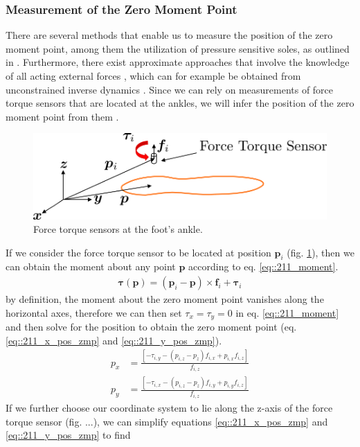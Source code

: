 \subsubsection{Measurement of the Zero Moment Point}
There are several methods that enable us to measure the position of the zero moment point, among them the utilization of pressure sensitive soles, as outlined in \cite{kajita2014introduction}. Furthermore, there exist approximate approaches that involve the knowledge of all acting external forces \cite{huang2001planning}, which can for example be obtained from unconstrained inverse dynamics \cite{michel2017dynamic}. Since we can rely on measurements of force torque sensors that are located at the ankles, we will infer the position of the zero moment point from them \cite{kajita2014introduction}. 
\begin{figure}[h!]
	\centering
	\includegraphics[scale=.5]{chapters/02_background/img/ft_sensor.png}
	\caption{Force torque sensors at the foot's ankle.}
	\label{fig::211_force_torque}
\end{figure}
If we consider the force torque sensor to be located at position $\bm{p}_i$ (fig. \ref{fig::211_force_torque}), then we can obtain the moment about any point $\bm{p}$ according to eq. \ref{eq::211_moment}.
\begin{align}
	\bm{\tau}(\bm{p}) = (\bm{p}_i-\bm{p})\times \bm{f}_i + \bm{\tau}_i
	\label{eq::211_moment}
\end{align}
by definition, the moment about the zero moment point vanishes along the horizontal axes, therefore we can then set $\tau_x = \tau_y = 0$ in eq. \ref{eq::211_moment} and then solve for the position to obtain the zero moment point (eq. \ref{eq::211_x_pos_zmp} and \ref{eq::211_y_pos_zmp}).
\begin{align}
	p_x &= \frac{\left[-\tau_{i,y}-(p_{i,z}-p_z)f_{i,x}+p_{i,x}f_{i,z}\right]}{f_{i,z}}
	\label{eq::211_x_pos_zmp}\\
	p_y &= \frac{\left[-\tau_{i,x}-(p_{i,z}-p_z)f_{i,y}+p_{i,y}f_{i,z}\right]}{f_{i,z}}
	\label{eq::211_y_pos_zmp}
\end{align}
If we further choose our coordinate system to lie along the z-axis of the force torque sensor (fig. ...), we can simplify equations \ref{eq::211_x_pos_zmp} and \ref{eq::211_y_pos_zmp} to find
